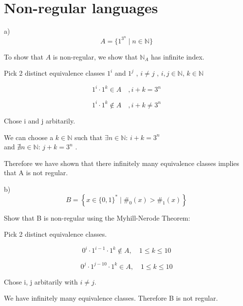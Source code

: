 



\section{Non-regular languages}

\textsc{}
a)
\[
A = \{1^{3^n} \mid n \in \mathbb{N}\}
\]

To show that \( A \) is non-regular, we show that \( \mathbb{N}_A \) has infinite index.

Pick 2 distinct equivalence classes \(1^i\) and \(1^j\) , \( i \neq j \) , \( i, j \in \mathbb{N} \), \( k \in \mathbb{N} \)

\[
1^i \cdot 1^k \in A  \quad  , i + k = 3^n
\]

\[
1^i \cdot 1^k \notin A  \quad  , i + k  \neq  3^n
\]

Chose i and j arbitarily.

We can choose a \( k \in \mathbb{N} \) such that \( \exists  n \in \mathbb{N}: \, i + k = 3^n \) \\and
  \( \nexists  n \in \mathbb{N}: \, j + k = 3^n \) . 

Therefore we have shown that there infinitely many equivalence classes implies that A is not regular.

\vspace{20pt}
b)
 \[
B = \left\{ x \in \{ 0, 1 \}^* \mid \#_0(x) > \#_1(x) \right\} 
\]

Show that B is non-regular using the Myhill-Nerode Theorem:

Pick 2 distinct equivalence classes. 

\[
0^i\cdot 1^{i-1}\cdot 1^k \notin A , \quad 1 \leq k \leq 10
\]

\[
0^j\cdot1^{j-10}\cdot1^k \in A, \quad 1 \leq k \leq 10
\]

Chose i, j arbitarily with \( i \neq j \).

We have infinitely many equivalence classes. Therefore B is not regular.






         




